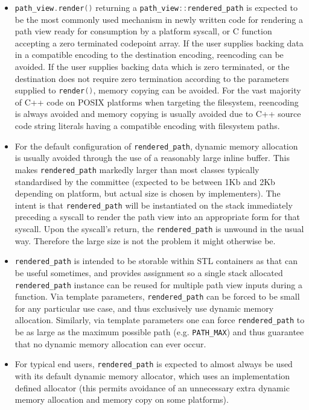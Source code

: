 \documentclass[11pt]{article}
\newcommand{\code}[2][cpp]{\lstinline[language=#1,basicstyle=\small\ttfamily]{#2}}
\begin{document}
\begin{itemize}
    \item \code{path_view.render()} returning a \code{path_view::rendered_path} is expected to be the most commonly used mechanism in newly written code for rendering a path view ready for consumption by a platform syscall, or C function accepting a zero terminated codepoint array. If the user supplies backing data in a compatible encoding to the destination encoding, reencoding can be avoided. If the user supplies backing data which is zero terminated, or the destination does not require zero termination according to the parameters supplied to \code{render()}, memory copying can be avoided. For the vast majority of C++ code on POSIX platforms when targeting the filesystem, reencoding is always avoided and memory copying is usually avoided due to C++ source code string literals having a compatible encoding with filesystem paths.
    \item For the default configuration of \code{rendered_path}, dynamic memory allocation is usually avoided through the use of a reasonably large inline buffer. This makes \code{rendered_path} markedly larger than most classes typically standardised by the committee (expected to be between 1Kb and 2Kb depending on platform, but actual size is chosen by implementers). The intent is that \code{rendered_path} will be instantiated on the stack immediately preceding a syscall to render the path view into an appropriate form for that syscall. Upon the syscall's return, the \code{rendered_path} is unwound in the usual way. Therefore the large size is not the problem it might otherwise be.
    \item \code{rendered_path} is intended to be storable within STL containers as that can be useful sometimes, and provides assignment so a single stack allocated \code{rendered_path} instance can be reused for multiple path view inputs during a function. Via template parameters, \code{rendered_path} can be forced to be small for any particular use case, and thus exclusively use dynamic memory allocation. Similarly, via template parameters one can force \code{rendered_path} to be as large as the maximum possible path (e.g. \code{PATH_MAX}) and thus guarantee that no dynamic memory allocation can ever occur.
    \item For typical end users, \code{rendered_path} is expected to almost always be used with its default dynamic memory allocator, which uses an implementation defined allocator (this permits avoidance of an unnecessary extra dynamic memory allocation and memory copy on some platforms).
    

\end{itemize}
\end{document}
